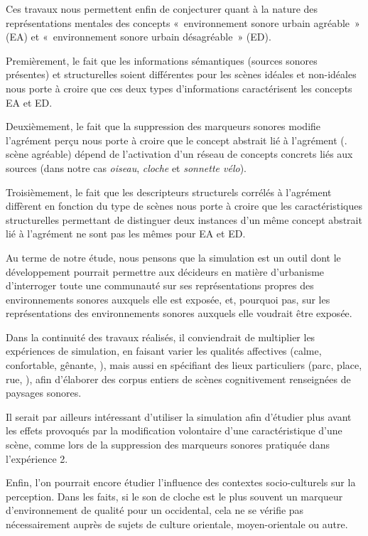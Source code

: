\documentclass[twoside,twocolumn]{article}
\begin{document}
Ces travaux nous permettent enfin de conjecturer quant à la nature des représentations mentales des concepts «~environnement sonore urbain agréable~» (EA) et «~environnement sonore urbain désagréable~» (ED).

Premièrement, le fait que les informations sémantiques (sources sonores présentes) et structurelles soient différentes pour les scènes idéales et non-idéales nous porte à croire que ces deux types d'informations caractérisent les concepts EA et ED.

Deuxièmement, le fait que la suppression des marqueurs sonores modifie l'agrément perçu nous porte à croire que le concept abstrait lié à l'agrément (\eg. scène agréable) dépend de l'activation d'un réseau de concepts concrets liés aux sources (dans notre cas \emph{oiseau}, \emph{cloche} et \emph{sonnette vélo}).

Troisièmement, le fait que les descripteurs structurels corrélés à l'agrément diffèrent en fonction du type de scènes nous porte à croire que les caractéristiques structurelles permettant de distinguer deux instances d'un même concept abstrait lié à l'agrément ne sont pas les mêmes pour EA et ED.

Au terme de notre étude, nous pensons que la simulation est un outil dont le développement pourrait permettre aux décideurs en matière d'urbanisme d'interroger toute une communauté sur ses représentations propres des environnements sonores auxquels elle est exposée, et, pourquoi pas, sur les représentations des environnements sonores auxquels elle voudrait être exposée.

Dans la continuité des travaux réalisés, il conviendrait de multiplier les expériences de simulation, en faisant varier les qualités affectives (calme, confortable, gênante, \etc), mais aussi en spécifiant des lieux particuliers (parc, place, rue, \etc), afin d'élaborer des corpus entiers de scènes cognitivement renseignées de paysages sonores. 

Il serait par ailleurs intéressant d'utiliser la simulation afin d'étudier plus avant les effets provoqués par la modification volontaire d'une caractéristique d'une scène, comme lors de la suppression des marqueurs sonores pratiquée dans l'expérience 2.

Enfin, l'on pourrait encore étudier l'influence des contextes socio-culturels sur la perception. Dans les faits, si le son de cloche est le plus souvent un marqueur d'environnement de qualité pour un occidental, cela ne se vérifie pas nécessairement auprès de sujets de culture orientale, moyen-orientale ou autre. 
\end{document}

